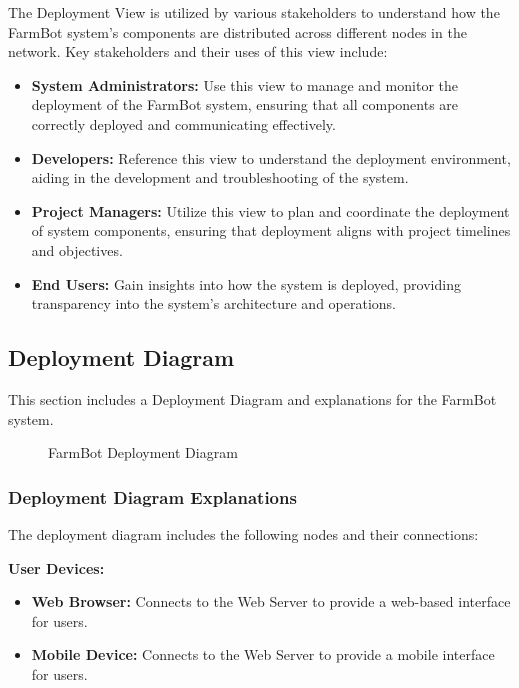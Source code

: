 The Deployment View is utilized by various stakeholders to understand how the FarmBot system's components are distributed across different nodes in the network. Key stakeholders and their uses of this view include:

\begin{itemize}
    \item \textbf{System Administrators:} Use this view to manage and monitor the deployment of the FarmBot system, ensuring that all components are correctly deployed and communicating effectively.
    \item \textbf{Developers:} Reference this view to understand the deployment environment, aiding in the development and troubleshooting of the system.
    \item \textbf{Project Managers:} Utilize this view to plan and coordinate the deployment of system components, ensuring that deployment aligns with project timelines and objectives.
    \item \textbf{End Users:} Gain insights into how the system is deployed, providing transparency into the system's architecture and operations.
\end{itemize}

\subsection{Deployment Diagram}

This section includes a Deployment Diagram and explanations for the FarmBot system.

\begin{figure}[H]
    \centering

\caption{FarmBot Deployment Diagram}
\end{figure}
\subsubsection{Deployment Diagram Explanations}

The deployment diagram includes the following nodes and their connections:

\textbf{User Devices:}
\begin{itemize}
    \item \textbf{Web Browser:} Connects to the Web Server to provide a web-based interface for users.
    \item \textbf{Mobile Device:} Connects to the Web Server to provide a mobile interface for users.
\end{itemize}

